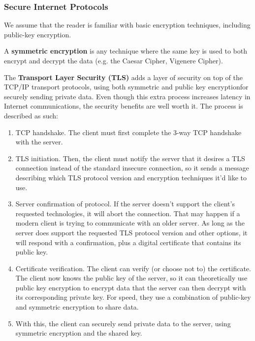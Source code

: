 \documentclass{article}
\begin{document}
  \subsubsection{Secure Internet Protocols}
  We assume that the reader is familiar with basic encryption techniques, including public-key encryption. 

  \begin{definition}
  A \textbf{symmetric encryption} is any technique where the same key is used to both encrypt and decrypt the data (e.g. the Caesar Cipher, Vigenere Cipher). 
  \end{definition}

  The \textbf{Transport Layer Security (TLS)} adds a layer of security on top of the TCP/IP transport protocols, using both symmetric and public key encryptionfor securely sending private data. Even though this extra process increases latency in Internet communications, the security benefits are well worth it. The process is described as such: 
  \begin{enumerate}
      \item TCP handshake. The client must first complete the 3-way TCP handshake with the server. 
      \item TLS initiation. Then, the client must notify the server that it desires a TLS connection instead of the standard insecure connection, so it sends a message describing which TLS protocol version and encryption techniques it'd like to use. 
      \item Server confirmation of protocol. If the server doesn't support the client's requested technologies, it will abort the connection. That may happen if a modern client is trying to communicate with an older server. As long as the server does support the requested TLS protocol version and other options, it will respond with a confirmation, plus a digital certificate that contains its public key. 
      \item Certificate verification. The client can verify (or choose not to) the certificate. The client now knows the public key of the server, so it can theoretically use public key encryption to encrypt data that the server can then decrypt with its corresponding private key. For speed, they use a combination of public-key and symmetric encryption to share data.
      \item With this, the client can securely send private data to the server, using symmetric encryption and the shared key. 
  \end{enumerate}
\end{document}
